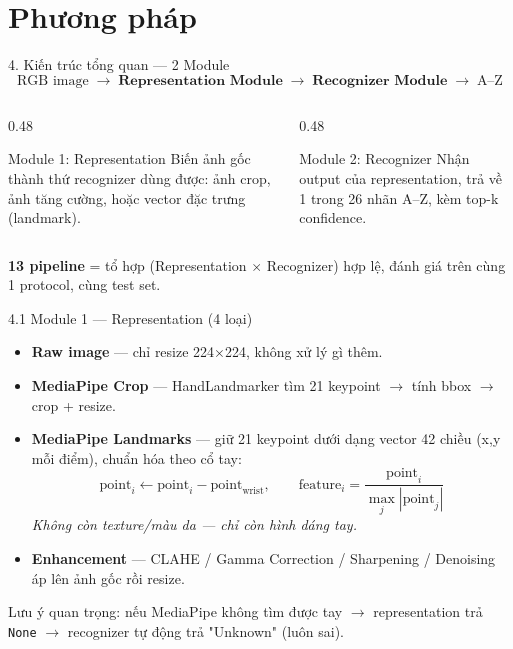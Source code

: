 \documentclass[t, aspectratio=169]{beamer} %
\begin{document}
	\section{Phương pháp}
	\begin{frame}{4. Kiến trúc tổng quan — 2 Module}
		\[
			\text{RGB image} \;\rightarrow\; \boxed{\textbf{Representation Module}} \;\rightarrow\; \boxed{\textbf{Recognizer Module}} \;\rightarrow\; \text{A--Z}
		\]

		\vspace{1em}
		\begin{columns}[T]
			\begin{column}{0.48\textwidth}
				\begin{block}{Module 1: Representation}
					\small Biến ảnh gốc thành thứ recognizer dùng được: ảnh crop, ảnh tăng cường, hoặc vector đặc trưng (landmark).
				\end{block}
			\end{column}
			\begin{column}{0.48\textwidth}
				\begin{alertblock}{Module 2: Recognizer}
					\small Nhận output của representation, trả về 1 trong 26 nhãn A--Z, kèm top-k confidence.
				\end{alertblock}
			\end{column}
		\end{columns}

		\vspace{1em}
		\textbf{13 pipeline} = tổ hợp (Representation $\times$ Recognizer) hợp lệ, đánh giá trên cùng 1 protocol, cùng test set.
	\end{frame}

	\begin{frame}{4.1 Module 1 — Representation (4 loại)}
		\begin{itemize}
			\item \textbf{Raw image} — chỉ resize 224$\times$224, không xử lý gì thêm.
			\item \textbf{MediaPipe Crop} — HandLandmarker tìm 21 keypoint $\rightarrow$ tính bbox $\rightarrow$ crop + resize.
			\item \textbf{MediaPipe Landmarks} — giữ 21 keypoint dưới dạng vector 42 chiều (x,y mỗi điểm), chuẩn hóa theo cổ tay:
			\[
				\text{point}_i \leftarrow \text{point}_i - \text{point}_{\text{wrist}}, \qquad
				\text{feature}_i = \frac{\text{point}_i}{\max_j |\text{point}_j|}
			\]
			\textit{Không còn texture/màu da — chỉ còn hình dáng tay.}
			\item \textbf{Enhancement} — CLAHE / Gamma Correction / Sharpening / Denoising áp lên ảnh gốc rồi resize.
		\end{itemize}

		\vspace{0.5em}
		\alert{Lưu ý quan trọng:} nếu MediaPipe không tìm được tay $\rightarrow$ representation trả \texttt{None} $\rightarrow$ recognizer tự động trả "Unknown" (luôn sai).
	\end{frame}
\end{document}
